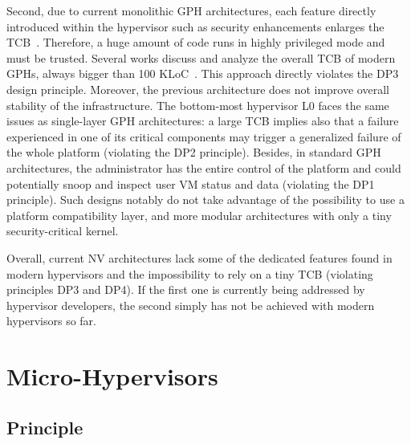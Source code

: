 \documentclass{sig-alternate}
\begin{document}
Second, due to current monolithic GPH architectures, each feature directly introduced within the hypervisor such as security enhancements enlarges the TCB~\cite{cloudvisor:zhang}. Therefore, a huge amount of code runs in highly privileged mode and must be trusted. Several works discuss and analyze the overall TCB of modern GPHs, always bigger than 100 KLoC~\cite{nova, xmhf}. This approach directly violates the DP3 design principle.
Moreover, the previous architecture does not improve overall stability of the infrastructure. The bottom-most hypervisor L0 faces the same issues as single-layer GPH architectures: a large TCB implies also that a failure experienced in one of its critical components may trigger a generalized failure of the whole platform (violating the DP2 principle). Besides, in standard GPH architectures, the administrator has the entire control of the platform and could potentially snoop and inspect user VM status and data (violating the DP1 principle).
Such designs notably do not take advantage of the possibility {\sffamily to use a platform compatibility layer}, and more modular architectures with only a tiny security-critical kernel.

Overall, current NV architectures lack some of the dedicated features found in modern hypervisors and the impossibility to rely on a tiny TCB (violating principles DP3 and DP4).
If the first one is currently being addressed by hypervisor developers, the second simply has not be achieved with modern hypervisors so far.

\section{Micro-Hypervisors}
\label{sec:mh}



\subsection{Principle}
\end{document}

